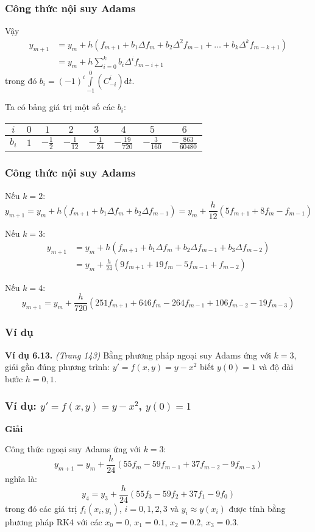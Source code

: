\begin{frame}
	\frametitle{Công thức nội suy Adams}
	Vậy
	\begin{align*}
		y_{m+1}&=y_m+h(f_{m+1}+b_1 \Delta f_m+b_2 \Delta^2 f_{m-1}+\ldots+b_k \Delta^k f_{m-k+1})\\
		       &=y_m+h\sum\limits_{i=0}^{k} b_i\Delta^i f_{m-i+1}
	\end{align*}
	trong đó $b_i=(-1)^i\int\limits_{-1}^{0} \left(C_{-i}^i\right)\mathrm{d}t$.\par
	Ta có bảng giá trị một số các $b_i$:
	\begin{center}\begin{tabular}{|c|c|c|c|c|c|c|c|}\hline
		$i$   & $0$ & $1$        & $2$             & $3$             & $4$               & $5$              & $6$\\\hline
		\tabularrowheight{24pt}
		$b_i$ & $1$ & $-\frac12$ & $-\frac{1}{12}$ & $-\frac{1}{24}$ & $-\frac{19}{720}$ & $-\frac{3}{160}$ & $-\frac{863}{60480}$\\\hline
	\end{tabular}\end{center}
\end{frame}

\begin{frame}
	\frametitle{Công thức nội suy Adams}
	Nếu $k=2$:
	$$y_{m+1}=y_m+h(f_{m+1}+b_1\Delta f_m+b_2\Delta f_{m-1})=y_m+\frac{h}{12}(5f_{m+1}+8f_m-f_{m-1})$$

	Nếu $k=3$:
	\begin{align*}
		y_{m+1}&=y_m+h(f_{m+1}+b_1\Delta f_m+b_2\Delta f_{m-1}+b_3\Delta f_{m-2})\\
		       &=y_m+\frac{h}{24}(9f_{m+1}+19f_m-5f_{m-1}+f_{m-2})
	\end{align*}

	Nếu $k=4$:
	$$y_{m+1}=y_m+\frac{h}{720}(251f_{m+1}+646f_m-264f_{m-1}+106f_{m-2}-19f_{m-3})$$
\end{frame}

\begin{frame}
	\frametitle{Ví dụ}
	\textbf{Ví dụ 6.13.} \textit{(Trang 143)} Bằng phương pháp ngoại suy Adams ứng với $k=3$, giải gần đúng phương trình: $y'=f(x,y)=y-x^2$ biết $y(0)=1$ và độ dài bước $h=0,1$.
\end{frame}

\begin{frame}
	\frametitle{Ví dụ: $y'=f(x,y)=y-x^2$, $y(0)=1$}
	\textbf{Giải}\par
	Công thức ngoại suy Adams ứng với $k=3$:\\
	$$y_{m+1}=y_m+\frac{h}{24} (55f_m-59f_{m-1}+37f_{m-2}-9f_{m-3})$$
	nghĩa là:
	$$y_4=y_3+\frac{h}{24} (55f_3-59f_2+37f_1-9f_0)$$
	trong đó các giá trị $f_i(x_i,y_i)$, $i=0,1,2,3$ và $y_i\approx y(x_i)$ được tính bằng phương pháp RK4 với các $x_0=0$, $x_1=0.1$, $x_2=0.2$, $x_3=0.3$.
\end{frame}


